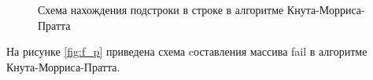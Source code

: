 \documentclass[a4paper, 14pt]{article}
\begin{document}
       \begin{figure}[h]
        	\caption{Схема нахождения подстроки в строке в алгоритме Кнута-Морриса-Пратта}
        	\label{fig:ant}
        \end{figure}
        \newpage  
        На рисунке \ref{fig:f_p} приведена схема cоставления массива fail в алгоритме Кнута-Морриса-Пратта.\\
\end{document}
